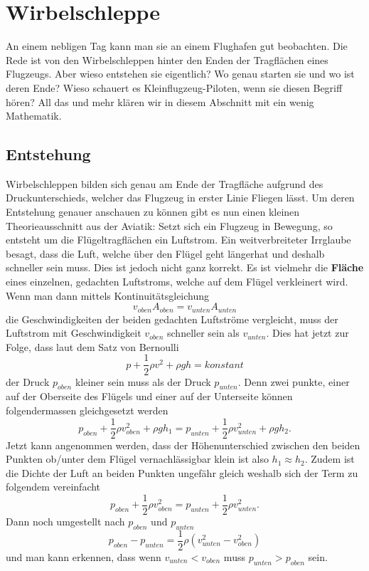 \section{Wirbelschleppe}
An einem nebligen Tag kann man sie an einem Flughafen gut beobachten. 
Die Rede ist von den Wirbelschleppen hinter den Enden der Tragflächen eines Flugzeugs.
Aber wieso entstehen sie eigentlich? 
Wo genau starten sie und wo ist deren Ende?
Wieso schauert es Kleinflugzeug-Piloten, wenn sie diesen Begriff hören?
All das und mehr klären wir in diesem Abschnitt mit ein wenig Mathematik.

\subsection{Entstehung}
Wirbelschleppen bilden sich genau am Ende der Tragfläche aufgrund des Druckunterschieds, welcher das Flugzeug in erster Linie Fliegen lässt.
Um deren Entstehung genauer anschauen zu können gibt es nun einen kleinen Theorieausschnitt aus der Aviatik:
Setzt sich ein Flugzeug in Bewegung, so entsteht um die Flügeltragflächen ein Luftstrom.
Ein weitverbreiteter Irrglaube besagt, dass die Luft, welche über den Flügel geht \glqq länger\grqq hat und deshalb schneller sein muss.
Dies ist jedoch nicht ganz korrekt.
Es ist vielmehr die \textbf{Fläche} eines einzelnen, gedachten Luftstroms, welche auf dem Flügel verkleinert wird.%
Wenn man dann mittels Kontinuitätsgleichung
\[v_{oben}A_{oben} = v_{unten}A_{unten}\]
die Geschwindigkeiten der beiden gedachten Luftströme vergleicht, muss der Luftstrom mit Geschwindigkeit $v_{oben}$ schneller sein als $v_{unten}$.
Dies hat jetzt zur Folge, dass laut dem Satz von Bernoulli 
\[p+\frac{1}{2}\rho v^2+\rho gh=konstant\]
der Druck $p_{oben}$ kleiner sein muss als der Druck $p_{unten}$.
Denn zwei punkte, einer auf der Oberseite des Flügels und einer auf der Unterseite können folgendermassen gleichgesetzt werden
\[p_{oben}+\frac{1}{2}\rho v^2_{oben} + \rho gh_1 = p_{unten}+\frac{1}{2}\rho v^2_{unten}+\rho gh_2.\]
Jetzt kann angenommen werden, dass der Höhenunterschied zwischen den beiden Punkten ob/unter dem Flügel vernachlässigbar klein ist also \(h_1\approx h_2\).
Zudem ist die Dichte der Luft an beiden Punkten ungefähr gleich weshalb sich der Term zu folgendem vereinfacht
\[p_{oben}+\frac{1}{2}\rho v^2_{oben} = p_{unten}+\frac{1}{2}\rho v^2_{unten}.\]
Dann noch umgestellt nach $p_{oben}$ und $p_{unten}$
\[p_{oben}-p_{unten} = \frac{1}{2}\rho( v^2_{unten}-v^2_{oben})\]
und man kann erkennen, dass wenn $v_{unten} < v_{oben}$ muss $p_{unten} > p_{oben}$ sein.
